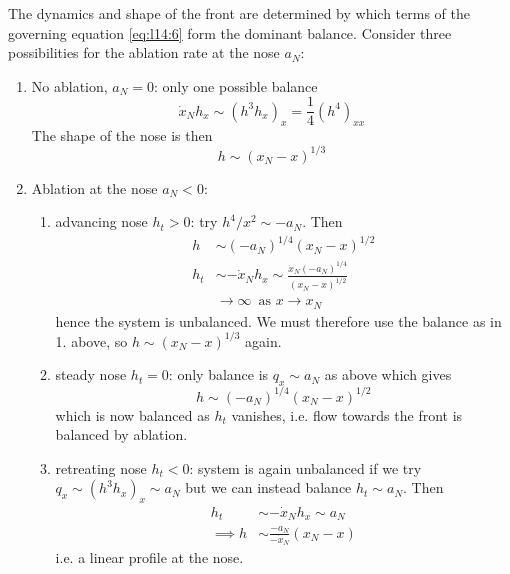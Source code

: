 \documentclass{jknotes}
\begin{document}
The dynamics and shape of the front are determined by which terms of the
governing equation \eqref{eq:l14:6} form the dominant balance. Consider three
possibilities for the ablation rate at the nose $a_N$:
\begin{enumerate}
	\item No ablation, $a_N = 0$: only one possible balance
		\begin{equation}
			\dot{x}_N h_x \sim (h^3 h_x)_x = \frac{1}{4}(h^4)_{xx}
		\end{equation}
		The shape of the nose is then
		\begin{equation}
			h \sim (x_N -x)^{1/3}
		\end{equation}
		\begin{center}
		\end{center}
	\item Ablation at the nose $a_N < 0$: 
		\begin{enumerate}
			\item advancing nose $h_t > 0$: try $h^4/x^2 \sim -a_N$. Then
				\begin{align}
					h &\sim (-a_N)^{1/4}(x_N-x)^{1/2} \\
					h_t &\sim -\dot{x}_N h_x \sim
					\frac{\dot{x}_N(-a_N)^{1/4}}{(x_N-x)^{1/2}} \\
						&\to \infty \,\,\,\text{as}\,\,x \to x_N
				\end{align}
				hence the system is unbalanced. We must therefore use the
				balance as in 1. above, so $h \sim (x_N - x)^{1/3}$ again.
			\item steady nose $h_t = 0$: only balance is $q_x \sim a_N$ as
				above which gives
				\begin{equation}
					h \sim (-a_N)^{1/4}(x_N-x)^{1/2}
				\end{equation}
				which is now balanced as $h_t$ vanishes, i.e. flow towards the
				front is balanced by ablation.
			\item retreating nose $h_t < 0$: system is again unbalanced if we
				try $q_x \sim (h^3h_x)_x \sim a_N$ but we can instead balance
				$h_t \sim a_N$. Then
				\begin{align}
					h_t &\sim -\dot{x}_N h_x \sim a_N \\
					\implies h&\sim \frac{-a_N}{-\dot{x}_N} (x_N -x)
				\end{align}
				i.e. a linear profile at the nose.
				\begin{center}
				\end{center}
		\end{enumerate}
\end{enumerate}
\end{document}
